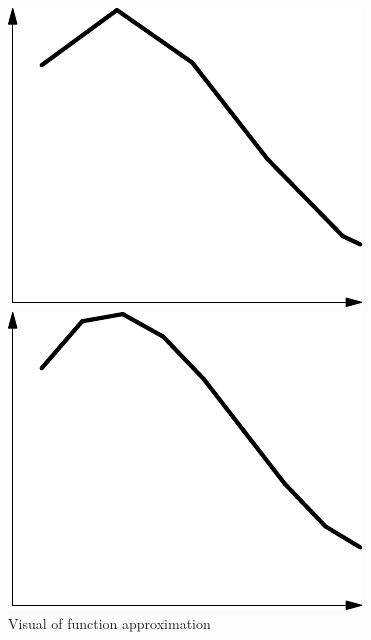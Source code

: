 \documentclass[12pt]{book}
\begin{document}
\begin{figure}[h]
    \centering
    \begin{minipage}{0.45\textwidth} %
        \centering
        \includegraphics[width=\textwidth]{./figures/2.2.pdf}
    \end{minipage}
    \hfill
    \begin{minipage}{0.45\textwidth} %
        \centering
        \includegraphics[width=\textwidth]{./figures/2.3.pdf}
    \end{minipage}
	\caption{Visual of function approximation}
\end{figure}
\end{document}
